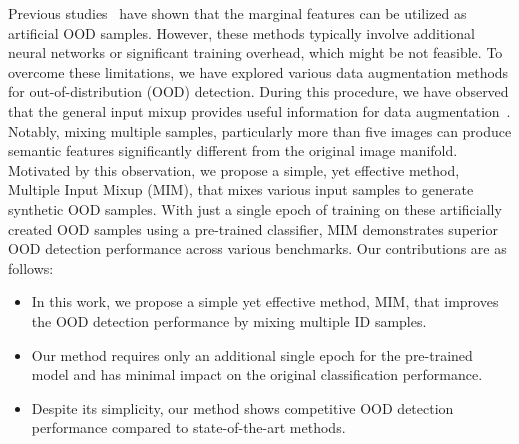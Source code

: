 \documentclass[letterpaper]{article} %
\begin{document}
Previous studies~\cite{kirby,gan} have shown that the marginal features can be utilized as artificial OOD samples.
However, these methods typically involve additional neural networks or significant training overhead, which might be not feasible.
To overcome these limitations, we have explored various data augmentation methods for out-of-distribution (OOD) detection.
During this procedure, we have observed that the general input mixup provides useful information for data augmentation~\cite{mixup}. Notably, mixing multiple samples, particularly more than five images can produce semantic features significantly different from the original image manifold.
Motivated by this observation, we propose a simple, yet effective method, Multiple Input Mixup (MIM), that mixes various input samples to generate synthetic OOD samples.
With just a single epoch of training on these artificially created OOD samples using a pre-trained classifier, MIM demonstrates superior OOD detection performance across various benchmarks.
Our contributions are as follows:
\begin{itemize}
    \item In this work, we propose a simple yet effective method, MIM, that improves the OOD detection performance by mixing multiple ID samples.
    \item Our method requires only an additional single epoch for the pre-trained model and has minimal impact on the original classification performance.
    \item Despite its simplicity, our method shows competitive OOD detection performance compared to state-of-the-art methods.
\end{itemize}
\end{document}
